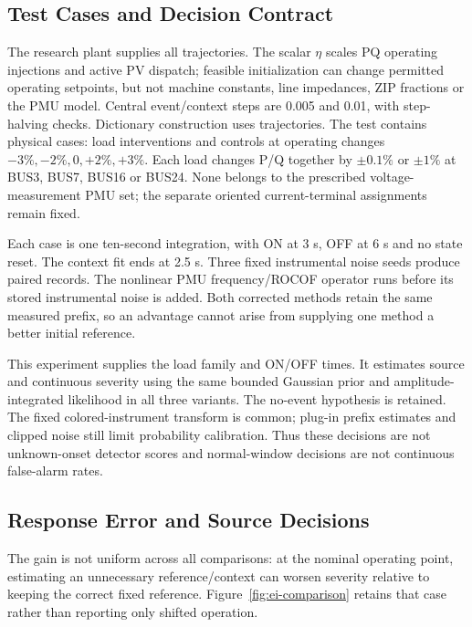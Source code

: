 \subsection{Test Cases and Decision Contract}
The research plant supplies all trajectories. The scalar $\eta$ scales
PQ operating injections and active PV dispatch; feasible initialization
can change permitted operating setpoints, but not machine constants,
line impedances, ZIP fractions or the PMU model. Central event/context
steps are 0.005 and 0.01, with step-halving checks. Dictionary construction
uses \EIDictionaryCases{} trajectories. The test contains \EITestPhysical{}
physical cases: \EIEventPhysical{} load interventions and \EINormalPhysical{}
controls at operating changes $-3\%,-2\%,0,+2\%,+3\%$. Each load changes
P/Q together by $\pm0.1\%$ or $\pm1\%$ at BUS3, BUS7, BUS16 or BUS24.
None belongs to the prescribed voltage-measurement PMU set; the separate
oriented current-terminal assignments remain fixed.

Each case is one ten-second integration, with ON at 3 s, OFF at 6 s and
no state reset. The context fit ends at 2.5 s. Three fixed instrumental
noise seeds produce \EIObserved{} paired records. The nonlinear PMU
frequency/ROCOF operator runs before its stored instrumental noise is
added. Both corrected methods retain the same measured prefix, so an
advantage cannot arise from supplying one method a better initial reference.

This experiment supplies the load family and ON/OFF times. It estimates
source and continuous severity using the same bounded Gaussian prior and
amplitude-integrated likelihood in all three variants. The no-event
hypothesis is retained. The fixed colored-instrument transform is common;
plug-in prefix estimates and clipped noise still limit probability
calibration. Thus these decisions are not unknown-onset detector scores
and normal-window decisions are not continuous false-alarm rates.

\subsection{Response Error and Source Decisions}



The gain is not uniform across all comparisons: at the nominal operating
point, estimating an unnecessary reference/context can worsen severity
relative to keeping the correct fixed reference. Figure~\ref{fig:ei-comparison}
retains that case rather than reporting only shifted operation.

